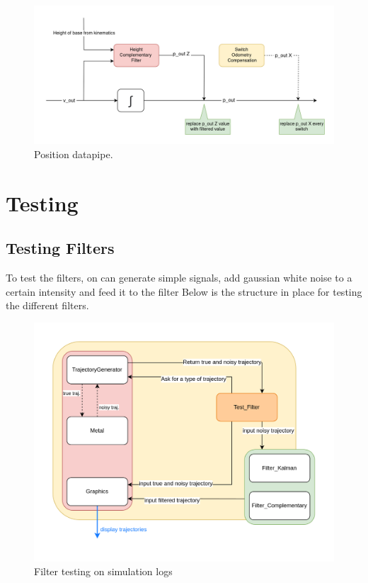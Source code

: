 \documentclass[a4paper,10pt]{article}
\begin{document}
\begin{figure}[H]
\label{fig:position_datapipe}
\centering
  \includegraphics[width=\linewidth, angle=0, scale=1]{./images/Variable_Position.png}
  \caption{Position datapipe.}
\end{figure}






\section{Testing}
\subsection{Testing Filters}
To test the filters, on can generate simple signals, add gaussian white noise to a certain intensity and feed it to the filter
Below is the structure in place for testing the different filters.
\begin{figure}[H]
\label{fig:test_filter_logs}
\centering
  \includegraphics[width=\linewidth, angle=0, scale=1]{./images/Action_Test.png}
  \caption{Filter testing on simulation logs}
\end{figure}
\end{document}
